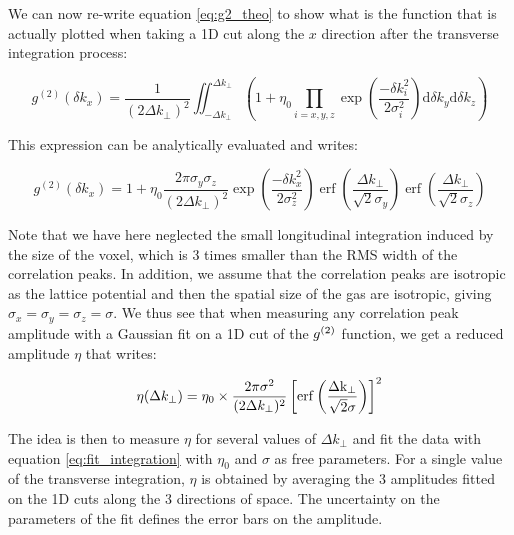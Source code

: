 We can now re-write equation \ref{eq:g2_theo} to show what is the function that is actually plotted when taking a 1D cut along the $x$ direction after the transverse integration process:

\begin{equation}
    g^{(2)} \left(\delta k_{x}\right)=\frac{1}{\left(2 \Delta k_{\perp}\right)^{2}} \iint_{-\Delta k_{\perp}}^{\Delta k_{\perp}} \left( 1+ \eta_0 \prod_{i=x, y, z} \exp \left(\frac{-\delta k_{i}^{2}}{2 \sigma_i^{2}}\right) \mathrm{d} \delta k_y \mathrm{d} \delta k_z \right)
\end{equation}

This expression can be analytically evaluated and writes:

\begin{equation}
    g^{(2)} \left(\delta k_{x}\right)=1+\eta_0 \frac{2 \pi \sigma_y \sigma_z}{\left(2 \Delta k_{\perp}\right)^{2}} \exp \left(\frac{-\delta k_{x}^{2}}{2 \sigma_{z}^{2}}\right) \operatorname{erf}\left(\frac{\Delta k_{\perp}}{\sqrt{2} \sigma_{y}}\right) \operatorname{erf}\left(\frac{\Delta k_{\perp}}{\sqrt{2} \sigma_{z}}\right)
\end{equation}

Note that we have here neglected the small longitudinal integration induced by the size of the voxel, which is 3 times smaller than the RMS width of the correlation peaks. In addition, we assume that the correlation peaks are isotropic as the lattice potential and then the spatial size of the gas are isotropic, giving $\sigma_x=\sigma_y=\sigma_z=\sigma$. We thus see that when measuring any correlation peak amplitude with a Gaussian fit on a 1D cut of the $g^{(2)}$ function, we get a reduced amplitude $\eta$ that writes:

\begin{equation}
    \eta (\Delta k_{\perp})= \eta_{0} \times \frac{2 \pi \sigma^2}{(2\Delta k_{\perp})^2}\left[\rm{erf} \left(\frac{\Delta k_{\perp}}{\sqrt{2}\sigma} \right)\right]^2
    \label{eq:fit_integration}
\end{equation}

The idea is then to measure $\eta$ for several values of $\Delta k_{\perp}$ and fit the data with equation \ref{eq:fit_integration} with $\eta_0$ and $\sigma$ as free parameters. For a single value of the transverse integration, $\eta$ is obtained by averaging the 3 amplitudes fitted on the 1D cuts along the 3 directions of space. The uncertainty on the parameters of the fit defines the error bars on the amplitude.

